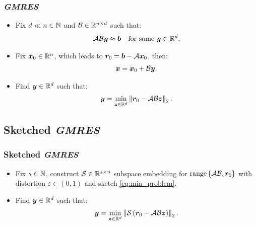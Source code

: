 \begin{frame}
    \frametitle{\textit{GMRES}}

    \begin{itemize}
        \item Fix $d \ll n \in \mathbb{N}$ and $\mathcal{B} \in \mathbb{R}^{n \times d}$ such that:
        \begin{align}
            \mathcal{A} \mathcal{B} \bm{y} &\approx \bm{b} &\text{for some } \bm{y} \in \mathbb{R}^{d}.
        \end{align}

        \item Fix $\bm{x}_0 \in \mathbb{R}^{n}$, which leads to $\bm{r}_0 = \bm{b} - \mathcal{A} \bm{x}_0$, then:
        \begin{align}
            \bm{x} = \bm{x}_0 + \mathcal{B} \bm{y}.
        \end{align}

        \item Find $\bm{y} \in \mathbb{R}^{d}$ such that:
        \begin{align}
            \bm{y} = \min_{\bm{z} \in \mathbb{R}^{d}} \left\lVert \bm{r}_0 - \mathcal{A} \mathcal{B} \bm{z} \right\rVert_2. \label{eq:min_problem}
        \end{align}
    \end{itemize}

\end{frame}

\subsection{Sketched \textit{GMRES}}

\begin{frame}
    \frametitle{Sketched \textit{GMRES}}

    \begin{itemize}
        \item Fix $s \in \mathbb{N}$, construct $\mathcal{S} \in \mathbb{R}^{s \times n}$ subspace embedding for $\operatorname*{range}\left\{\mathcal{A} \mathcal{B}, \bm{r}_0\right\}$ with distortion $\varepsilon \in \left(0, 1\right)$ and sketch \cref{eq:min_problem}.

        \item Find $\bm{y} \in \mathbb{R}^{d}$ such that:
        \begin{align}
            \bm{y} = \min_{\bm{z} \in \mathbb{R}^{d}} \left\lVert  \mathcal{S} \left( \bm{r}_0 - \mathcal{A} \mathcal{B} \bm{z} \right) \right\rVert_2. \label{eq:sketched_min_problem}
        \end{align}
    \end{itemize}
    
\end{frame}

